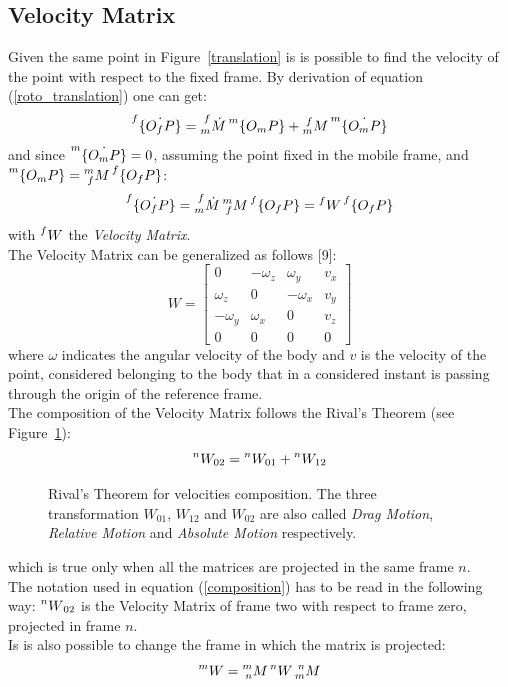 \documentclass[a4paper,12pt,oneside]{report}
\begin{document}
\subsection{Velocity Matrix}\label{velocity_section}
Given the same point in Figure~\ref{translation} is is possible to find the velocity of the point with respect to the fixed frame. By derivation of equation (\ref{roto_translation}) one can get:
\begin{equation}
  \prescript{f}{}{\{\dot{O_fP}\}}=\prescript{f}{m}{\dot{M}}\prescript{m}{}{\{O_mP\}}+\prescript{f}{m}{M}\prescript{m}{}{\{\dot{O_mP}\}}
\end{equation}
and since $\prescript{m}{}{\{\dot{O_mP}\}}=0$, assuming the point fixed in the mobile frame, and $\prescript{m}{}{\{O_mP\}}=\prescript{m}{f}{M}\prescript{f}{}{\{O_fP\}}$:
\begin{equation}
  \prescript{f}{}{\{\dot{O_fP}\}}=\prescript{f}{m}{\dot{M}}\prescript{m}{f}{M}\prescript{f}{}{\{O_fP\}}=\prescript{f}{}{W}\prescript{f}{}{\{O_fP\}}
  \label{velocity_matrix}
\end{equation}
with $\prescript{f}{}{W}$ the \textit{Velocity Matrix}.\\
The Velocity Matrix can be generalized as follows [9]:
\begin{equation}
  W=\begin{bmatrix}
    0&-\omega_z&\omega_y&v_x\\
    \omega_z&0&-\omega_x&v_y\\
    -\omega_y&\omega_x&0&v_z\\
    0&0&0&0
  \end{bmatrix}
\end{equation}
where $\omega$ indicates the angular velocity of the body and $v$ is the velocity of the point, considered belonging to the body that in a considered instant is passing through the origin of the reference frame.\\
The composition of the Velocity Matrix follows the Rival's Theorem (see Figure~\ref{rival}):
\begin{equation}
  \prescript{n}{}{W_{02}}=\prescript{n}{}{W_{01}}+\prescript{n}{}{W_{12}}
  \label{composition}
\end{equation}
\begin{figure}[h]
  \centering
  
  \caption{Rival's Theorem for velocities composition. The three transformation $W_{01}$, $W_{12}$ and $W_{02}$ are also called \textit{Drag Motion}, \textit{Relative Motion} and \textit{Absolute Motion} respectively.}
  \label{rival}
\end{figure}
which is true only when all the matrices are projected in the same frame $n$.\\
The notation used in equation (\ref{composition}) has to be read in the following way: $\prescript{n}{}{W}_{02}$ is the Velocity Matrix of frame two with respect to frame zero, projected in frame $n$.\\
Is is also possible to change the frame in which the matrix is projected:
\begin{equation}
  \prescript{m}{}{W}=\prescript{m}{n}{M}\prescript{n}{}{W}\prescript{n}{m}{M}
  \label{change_frame}
\end{equation}
\end{document}
